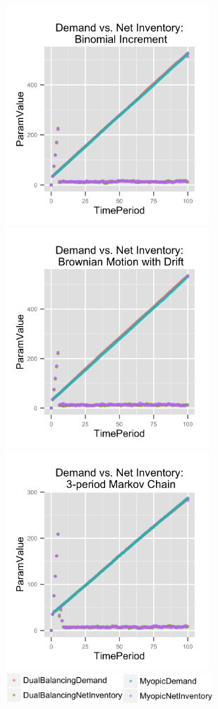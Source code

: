 \documentclass[twoside]{article}
\begin{document}
\begin{multicols}{2}
  \includegraphics[width=3.0in]{figures/DemandAndNetInventory_Binomial.png}
  \includegraphics[width=3.0in]{figures/DemandAndNetInventory_Brownian.png}
  \includegraphics[width=3.0in]{figures/DemandAndNetInventory_Markov.png}
  \includegraphics[width=3.05in]{figures/key2.png}

\end{multicols}
\end{document}
